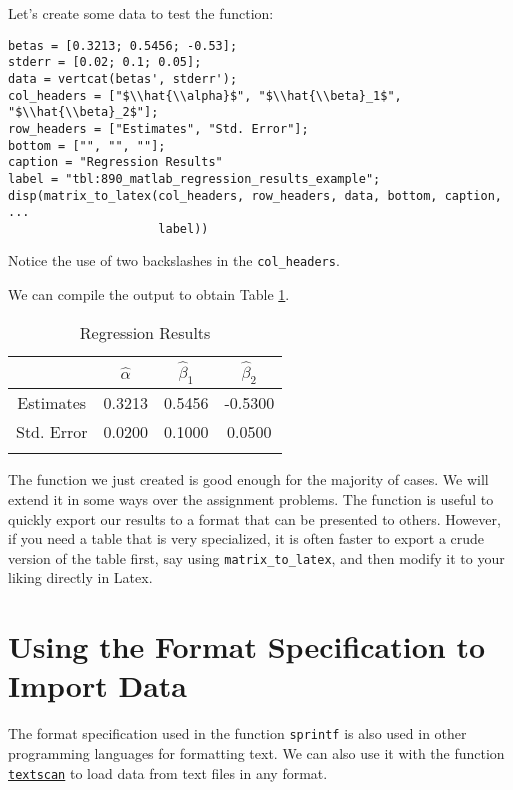 \documentclass[12pt, a4paper]{article}
\begin{document}
Let's create some data to test the function:
\lstset{language=matlab,label= ,caption= ,captionpos=b,firstnumber=1,numbers=left,style=Matlab-editor}
\begin{lstlisting}
betas = [0.3213; 0.5456; -0.53];
stderr = [0.02; 0.1; 0.05];
data = vertcat(betas', stderr');
col_headers = ["$\\hat{\\alpha}$", "$\\hat{\\beta}_1$", "$\\hat{\\beta}_2$"];
row_headers = ["Estimates", "Std. Error"];
bottom = ["", "", ""];
caption = "Regression Results"
label = "tbl:890_matlab_regression_results_example";
disp(matrix_to_latex(col_headers, row_headers, data, bottom, caption, ...
                     label))
\end{lstlisting}
Notice the use of two backslashes in the \texttt{col\_headers}.

We can compile the output to obtain Table \ref{tbl:890_matlab_regression_results_example}.
\begin{table}[H]
  \centering
  \begin{tabular}{cccc}
    &$\hat{\alpha}$&$\hat{\beta}_1$&$\hat{\beta}_2$\\
    \toprule
    Estimates &0.3213 &0.5456 &-0.5300\\
    Std. Error &0.0200 &0.1000 &0.0500\\
    \midrule
    &&&\\
    \bottomrule
  \end{tabular}
  \caption{Regression Results}
  \label{tbl:890_matlab_regression_results_example}
\end{table}


The function we just created is good enough for the majority of cases.
We will extend it in some ways over the assignment problems.
The function is useful to quickly export our results to a format that can be presented to others.
However, if you need a table that is very specialized, it is often faster to export a crude version of the table first, say using \texttt{matrix\_to\_latex}, and then modify it to your liking directly in Latex.
\section{Using the Format Specification to Import Data}
\label{sec:orgceecf89}
The format specification used in the function \texttt{sprintf} is also used in other programming languages for formatting text.
We can also use it with the function \href{https://www.mathworks.com/help/matlab/ref/textscan.html}{\texttt{textscan}} to load data from text files in any format.
\end{document}
